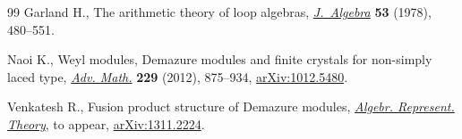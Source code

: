 \documentclass[10pt,a4paper]{amsart}
\begin{document}
\begin{thebibliography}{99}
Garland H., The arithmetic theory of loop algebras, \href{http://dx.doi.org/10.1016/0021-8693(78)90294-6}{\textit{J.~Algebra}}
  \textbf{53} (1978), 480--551.

Naoi K., Weyl modules, {D}emazure modules and f\/inite crystals for non-simply
  laced type, \href{http://dx.doi.org/10.1016/j.aim.2011.10.005}{\textit{Adv. Math.}} \textbf{229} (2012), 875--934,
  \href{http://arxiv.org/abs/1012.5480}{arXiv:1012.5480}.

Venkatesh R., Fusion product structure of Demazure modules, \href{http://dx.doi.org/10.1007/s10468-014-9495-6}{\textit{Algebr.
  Represent. Theory}}, {t}o appear, \href{http://arxiv.org/abs/1311.2224}{arXiv:1311.2224}.

\end{thebibliography}
\end{document}

